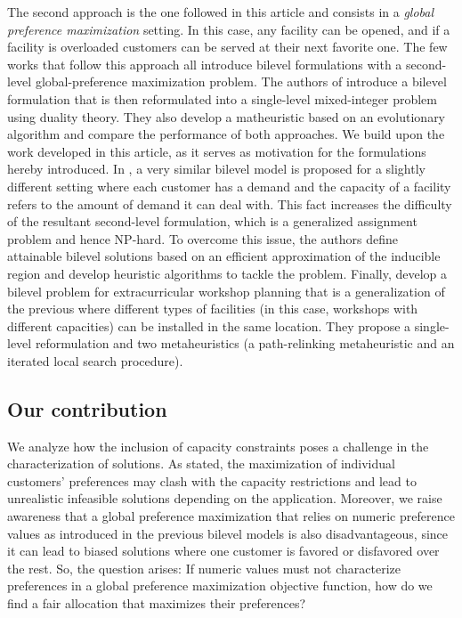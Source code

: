 \documentclass[preprint,11pt,authoryear]{elsarticle}
\newcommand\red[1]{{\color{red}#1}}
\begin{document}
The second approach is the one followed in this article and consists in a \textit{global preference maximization} setting. In this case, any facility can be opened, and if a facility is overloaded customers can be served at their next favorite one. The few works that follow this approach all introduce bilevel formulations with a second-level global-preference maximization problem. The authors of \cite{calvete2020} introduce a bilevel formulation that is then reformulated into a single-level mixed-integer problem using duality theory. They also develop a matheuristic based on an evolutionary algorithm and compare the performance of both approaches. We build upon the work developed in this article, as it serves as motivation for the formulations hereby introduced. In \cite{casas2018}, a very similar bilevel model is proposed for a slightly different setting where each customer has a demand and the capacity of a facility refers to the amount of demand it can deal with. This fact increases the difficulty of the resultant second-level formulation, which is a generalized assignment problem and hence NP-hard. To overcome this issue, the authors define attainable bilevel solutions based on an efficient approximation of the inducible region and develop heuristic algorithms to tackle the problem. Finally, \cite{polino2024} develop a bilevel problem for extracurricular workshop planning that is a generalization of the previous where different types of facilities (in this case, workshops with different capacities) can be installed in the same location. They propose a single-level reformulation and two metaheuristics (a path-relinking metaheuristic and an iterated local search procedure).


\subsection{Our contribution}
We analyze how the inclusion of capacity constraints poses a challenge in the characterization of solutions. As stated, the maximization of individual customers' preferences may clash with the capacity restrictions and lead to unrealistic infeasible solutions depending on the application. Moreover, we raise awareness that a global preference maximization that relies on numeric preference values as introduced in the previous bilevel models is also disadvantageous, since it can lead to biased solutions where one customer is favored or disfavored over the rest.  So, the question arises: If numeric values must not characterize preferences in a global preference maximization objective function, how do we find a fair allocation that maximizes their preferences?
    
\end{document}
